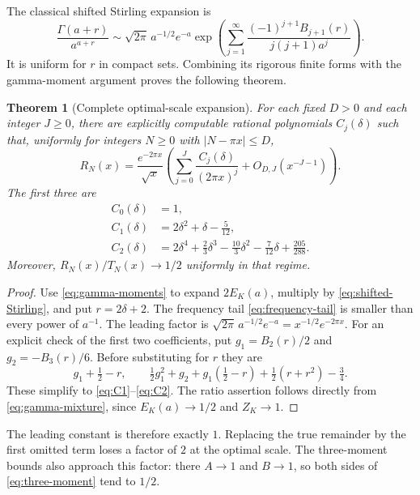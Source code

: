 \documentclass[11pt]{article}
\numberwithin{equation}{section}
\newtheorem{theorem}{Theorem}[section]
\theoremstyle{definition}
\theoremstyle{remark}
\begin{document}
The classical shifted Stirling expansion \cite[\S5.11.8]{DLMF} is
\begin{equation}\label{eq:shifted-Stirling}
 \frac{\Gamma(a+r)}{a^{a+r}}
 \sim \sqrt{2\pi}\,a^{-1/2}e^{-a}
 \exp\left(\sum_{j=1}^\infty
 \frac{(-1)^{j+1}B_{j+1}(r)}{j(j+1)a^j}\right).
\end{equation}
It is uniform for $r$ in compact sets. Combining its rigorous finite
forms with the gamma-moment argument proves the following theorem.

\begin{theorem}[Complete optimal-scale expansion]\label{thm:sharp}
For each fixed $D>0$ and each integer $J\ge0$, there are explicitly
computable rational polynomials $C_j(\delta)$ such that, uniformly
for integers $N\ge0$ with $|N-\pi x|\le D$,
\begin{equation}\label{eq:all-orders}
 R_N(x)=\frac{e^{-2\pi x}}{\sqrt{x}}
 \left(\sum_{j=0}^{J}\frac{C_j(\delta)}{(2\pi x)^j}
       +O_{D,J}(x^{-J-1})\right).
\end{equation}
The first three are
\begin{align}
 C_0(\delta)&=1,\nonumber\\
 C_1(\delta)&=2\delta^2+\delta-\frac5{12},\label{eq:C1}\\
 C_2(\delta)&=2\delta^4+\frac23\delta^3-\frac{10}3\delta^2
                         -\frac7{12}\delta+\frac{205}{288}.
 \label{eq:C2}
\end{align}
Moreover, $R_N(x)/T_N(x)\longrightarrow1/2$ uniformly in that regime.
\end{theorem}
\begin{proof}
Use \eqref{eq:gamma-moments} to expand $2E_K(a)$, multiply by
\eqref{eq:shifted-Stirling}, and put $r=2\delta+2$.
The frequency tail \eqref{eq:frequency-tail} is smaller than every
power of $a^{-1}$. The leading factor is
$\sqrt{2\pi}\,a^{-1/2}e^{-a}=x^{-1/2}e^{-2\pi x}$.
For an explicit check of the first two coefficients, put
$g_1=B_2(r)/2$ and $g_2=-B_3(r)/6$. Before substituting for $r$ they are
\[
 g_1+\tfrac12-r,\qquad
 \tfrac12g_1^2+g_2+g_1(\tfrac12-r)
                       +\tfrac12(r+r^2)-\tfrac34.
\]
These simplify to \eqref{eq:C1}--\eqref{eq:C2}. The ratio assertion
follows directly from \eqref{eq:gamma-mixture}, since $E_K(a)\to1/2$
and $Z_K\to1$.
\end{proof}

The leading constant is therefore exactly $1$. Replacing the true
remainder by the first omitted term loses a factor of $2$ at the
optimal scale. The three-moment bounds also approach this factor:
there $A\to1$ and $B\to1$, so both sides of
\eqref{eq:three-moment} tend to $1/2$.
\end{document}
